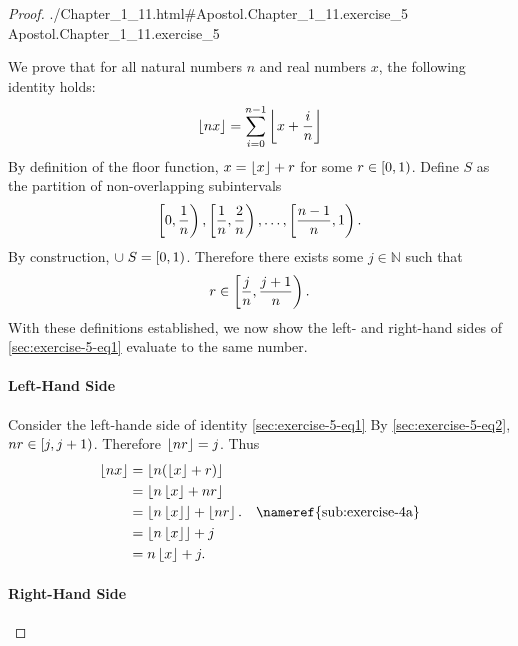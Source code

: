 \documentclass{article}
\newcommand{\lean}[1]{\leanref
  {./Chapter\_1\_11.html\#Apostol.Chapter\_1\_11.#1}
  {Apostol.Chapter\_1\_11.#1}}
\begin{document}
\begin{proof}

  \lean{exercise\_5}

  \divider

  We prove that for all natural numbers $n$ and real numbers $x$, the following
    identity holds:
    \begin{equation}
      \label{sec:exercise-5-eq1}
      \left\lfloor nx\right\rfloor = \sum_{i=0}^{n-1} \left\lfloor x + \frac{i}{n}\right\rfloor
    \end{equation}
  By definition of the floor function, $x = \left\lfloor x\right\rfloor + r$ for some
    $r \in \left[0, 1\right)$.
  Define $S$ as the partition of non-overlapping subintervals
    $$\left[0, \frac{1}{n}\right), \left[\frac{1}{n}, \frac{2}{n}\right), \ldots,
      \left[\frac{n-1}{n}, 1\right).$$
  By construction, $\cup\; S = \left[0, 1\right)$.
  Therefore there exists some $j \in \mathbb{N}$ such that
    \begin{equation}
      \label{sec:exercise-5-eq2}
      r \in \left[\frac{j}{n}, \frac{j+1}{n}\right).
    \end{equation}
  With these definitions established, we now show the left- and right-hand sides
    of \eqref{sec:exercise-5-eq1} evaluate to the same number.

  \paragraph{Left-Hand Side}%

    Consider the left-hande side of identity \eqref{sec:exercise-5-eq1}
    By \eqref{sec:exercise-5-eq2}, $nr \in \left[j, j + 1\right)$.
    Therefore $\left\lfloor nr\right\rfloor = j$.
    Thus
      \begin{align}
        \floor{nx}
          & = \floor{n(\floor{x} + r)} \nonumber \\
          & = \floor{n\floor{x} + nr} \nonumber \\
          & = \floor{n\floor{x}} + \floor{nr}. \nonumber
            & \text{\nameref{sub:exercise-4a}} \\
          & = \floor{n\floor{x}} + j \nonumber \\
          & = n\floor{x} + j. \label{sec:exercise-5-eq3}
      \end{align}

  \paragraph{Right-Hand Side}%


\end{proof}
\end{document}
